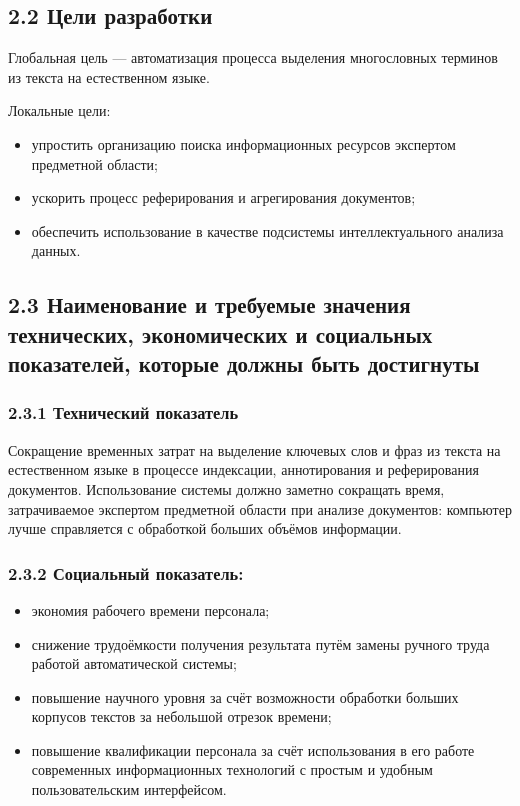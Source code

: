 \subsection*{2.2 Цели разработки}
Глобальная цель — автоматизация процесса выделения многословных
терминов из текста на естественном языке.

Локальные цели:
\begin{itemize}
  \item упростить организацию поиска информационных ресурсов
экспертом предметной области;
  \item ускорить процесс реферирования и агрегирования документов;
  \item обеспечить использование в качестве подсистемы
интеллектуального анализа данных.
\end{itemize}

\subsection*{2.3 Наименование и требуемые значения технических, экономических и социальных показателей, которые должны быть достигнуты}
\subsubsection*{2.3.1 Технический показатель}
Сокращение временных затрат на выделение ключевых слов и фраз из
текста на естественном языке в процессе индексации, аннотирования
и реферирования документов. Использование системы должно заметно
сокращать время, затрачиваемое экспертом предметной области при
анализе документов: компьютер лучше справляется с обработкой
больших объёмов информации.

\subsubsection*{2.3.2 Социальный показатель:}
\begin{itemize}
  \item экономия рабочего времени персонала;
  \item снижение трудоёмкости получения результата путём замены
ручного труда работой автоматической системы;
  \item повышение научного уровня за счёт возможности обработки
больших корпусов текстов за небольшой отрезок времени;
  \item повышение квалификации персонала за счёт использования в его
работе современных информационных технологий с простым и удобным
пользовательским интерфейсом.
\end{itemize}

